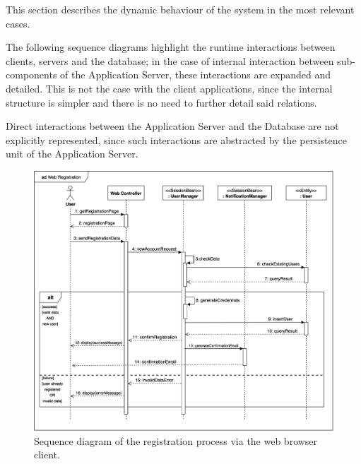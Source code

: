 This section describes the dynamic behaviour of the system in the most relevant cases.

The following sequence diagrams highlight the runtime interactions between clients, servers and the database; in the case of internal interaction between sub-components of the Application Server, these interactions are expanded and detailed. This is not the case with the client applications, since the internal structure is simpler and there is no need to further detail said relations.

Direct interactions between the Application Server and the Database are not explicitly represented, since such interactions are abstracted by the persistence unit of the Application Server.

\begin{figure}[H]
\begin{center}
		\includegraphics[width=\textwidth]{./arch_design/diagrams/registration_sd.png}
		\caption{Sequence diagram of the registration process via the web browser client.}
		\label{registration_sd}
\end{center}
\end{figure}

